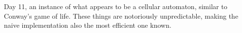 Day 11, an instance of what appears to be a cellular automaton, similar to Conway's game of life. These things are notoriously unpredictable, making the naive implementation also the most efficient one known.